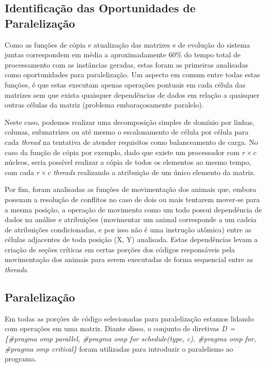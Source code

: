 \documentclass[a4paper, 12pt]{article}
\begin{document}
\subsection{Identificação das Oportunidades de Paralelização}

Como as funções de cópia e atualização das matrizes e de evolução do sistema juntas correspondem em média a aproximadamente 60\% do tempo total de processamento com as instâncias geradas, estas foram as primeiras analisadas como oportunidades para paralelização. Um aspecto em comum entre todas estas funções, é que estas executam apenas operações pontuais em cada célula das matrizes sem que exista quaisquer dependências de dados em relação a quaisquer outras células da matriz (problema embaraçosamente paralelo).

Neste caso, podemos realizar uma decomposição simples de domínio por linhas, colunas, submatrizes ou até mesmo o escalonamento de célula por célula para cada \emph{thread} na tentativa de atender requisitos como balanceamento de carga. No caso da função de cópia por exemplo, dado que existe um processador com \(r \times c\) núcleos, seria possível realizar a cópia de todos os elementos ao mesmo tempo, com cada \(r \times c\) \emph{threads} realizando a atribuição de um único elemento da matriz.

Por fim, foram analisadas as funções de movimentação dos animais que, embora possuam a resolução de conflitos no caso de dois ou mais tentarem mover-se para a mesma posição, a operação de movimento como um todo possui dependência de dados na análise e atribuições (movimentar um animal corresponde a um cadeia de atribuições condicionadas, e por isso não é uma instrução atômica) entre as células adjacentes de toda posição (X, Y) analisada. Estas dependências levam a criação de seções críticas em certas porções dos códigos responsáveis pela movimentação dos animais para serem executadas de forma sequencial entre as \emph{threads}.

\subsection{Paralelização}

Em todas as porções de código selecionadas para paralelização estamos lidando com operações em uma matriz. Diante disso, o conjunto de diretivas \textit{D = \{\#pragma omp parallel, \#pragma omp for schedule(type, c), \#pragma omp for, \#pragma omp critical\}} foram utilizadas para introduzir o paralelismo ao programa.
\end{document}
